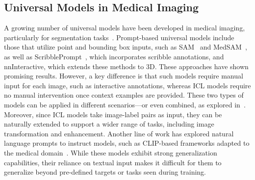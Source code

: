 \subsection{Universal Models in Medical Imaging}
A growing number of universal models have been developed in medical imaging, particularly for segmentation tasks~\cite{ma2024segment, wong2024scribbleprompt,liu2023clip, ye2023cardiacseg}. Prompt-based universal models include those that utilize point and bounding box inputs, such as SAM~\cite{kirillov2023segment} and MedSAM~\cite{ma2024segment}, as well as ScribblePrompt~\cite{wong2024scribbleprompt}, which incorporates scribble annotations, and nnInteractive, which extends these methods to 3D. These approaches have shown promising results. However, a key difference is that such models require manual input for each image, such as interactive annotations, whereas ICL models require no manual intervention once context examples are provided. These two types of models can be applied in different scenarios—or even combined, as explored in~\cite{hu2024icl}. Moreover, since ICL models take image-label pairs as input, they can be naturally extended to support a wider range of tasks, including image transformation and enhancement. Another line of work has explored natural language prompts to instruct models, such as CLIP-based frameworks adapted to the medical domain~\cite{liu2023clip, liu2024universal}. While these models exhibit strong generalization capabilities, their reliance on textual input makes it difficult for them to generalize beyond pre-defined targets or tasks seen during training.

\clearpage
